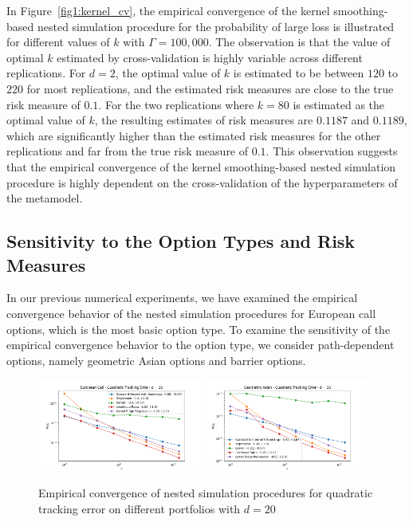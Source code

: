 In Figure~\ref{fig1:kernel_cv}, the empirical convergence of the kernel smoothing-based nested simulation procedure for the probability of large loss is illustrated for different values of $k$ with $\Gamma = 100,000$.
The observation is that the value of optimal $k$ estimated by cross-validation is highly variable across different replications.
For $d = 2$, the optimal value of $k$ is estimated to be between $120$ to $220$ for most replications, and the estimated risk measures are close to the true risk measure of $0.1$.
For the two replications where $k = 80$ is estimated as the optimal value of $k$, the resulting estimates of risk measures are $0.1187$ and $0.1189$, which are significantly higher than the estimated risk measures for the other replications and far from the true risk measure of $0.1$.
This observation suggests that the empirical convergence of the kernel smoothing-based nested simulation procedure is highly dependent on the cross-validation of the hyperparameters of the metamodel.

\subsection{Sensitivity to the Option Types and Risk Measures} \label{sec1:sensitivity-option-type}

In our previous numerical experiments, we have examined the empirical convergence behavior of the nested simulation procedures for European call options, which is the most basic option type.
To examine the sensitivity of the empirical convergence behavior to the option type, we consider path-dependent options, namely geometric Asian options and barrier options.

\begin{figure}[ht!] 
    \centering
    \includegraphics[width=0.48\textwidth]{./project1/figures/figure6a.png}
    \includegraphics[width=0.48\textwidth]{./project1/figures/figure6b.png}
    \caption{Empirical convergence of nested simulation procedures for quadratic tracking error on different portfolios with $d=20$}
    \label{fig1:1x03} 
\end{figure}

